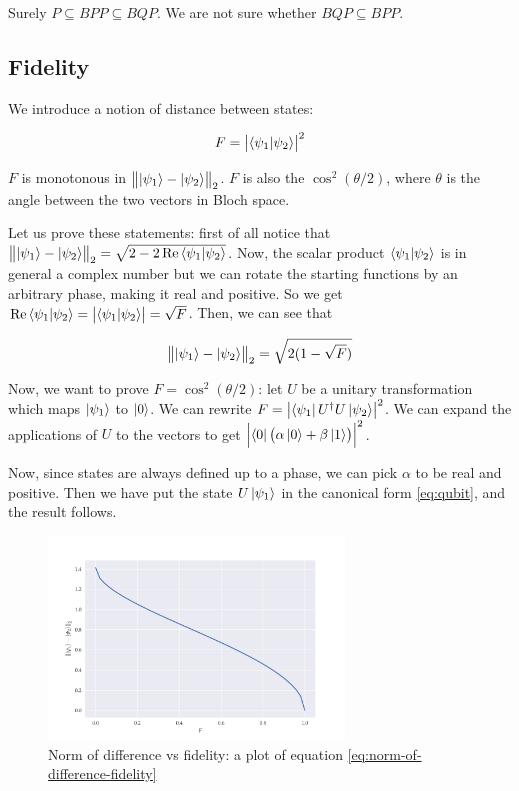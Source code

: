 \documentclass[main.tex]{subfiles}
\begin{document}
Surely \(P \subseteq BPP \subseteq BQP\). We are not sure whether \(BQP \subseteq BPP\).

\subsection{Fidelity}

We introduce a notion of distance between states:

\begin{equation}
    F = \abs{\braket{\psi_1}{\psi_2} }^2
\end{equation}

\(F\) is monotonous in \(\norm{\ket{\psi_1} - \ket{\psi _2} }_2\).
\(F\) is also the \(\cos^2(\theta/2) \), where \(\theta\) is the angle between the two vectors in Bloch space.

\begin{bluebox}
  Let us prove these statements: first of all notice that \(\norm{\ket{\psi_1} - \ket{\psi _2} }_2 = \sqrt{2 - 2 \Re \braket{\psi_1}{\psi_2}}\).
  Now, the scalar product \(\braket{\psi_1}{\psi_2}\) is in general a complex number but we can rotate the starting functions by an arbitrary phase, making it real and positive. So we get \(\Re \braket{\psi_1}{\psi_2} = \abs{\braket{\psi_1}{\psi_2}}  = \sqrt{F} \). Then, we can see that

  \begin{equation} \label{eq:norm-of-difference-fidelity}
    \norm{\ket{\psi_1} - \ket{\psi _2} }_2 = \sqrt{2(1-\sqrt{F})}
  \end{equation}

  Now, we want to prove \(F = \cos^2(\theta/2) \): let \(U\) be a unitary transformation which maps \(\ket{\psi _1} \) to \(\ket{0}\). We can rewrite \(F = \abs{\bra{\psi_1} U^\dag U \ket{\psi_2}}^2\). We can expand the applications of \(U\) to the vectors to get \(\abs{\bra{0} \qty(\alpha \ket{0} + \beta \ket{1} ) }^2\).

  Now, since states are always defined up to a phase, we can pick \(\alpha\) to be real and positive. Then we have put the state \(U \ket{\psi_1}\) in the canonical form \eqref{eq:qubit}, and the result follows.
\end{bluebox}

\begin{figure}
    \centering
    \includegraphics[width=0.7\textwidth]{figures/Fidelity.pdf}
    \caption{Norm of difference vs fidelity: a plot of equation \eqref{eq:norm-of-difference-fidelity}}
    \label{fig:fidelity}
\end{figure}
\end{document}
